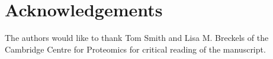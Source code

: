 \documentclass[12pt,english]{article}
\begin{document}

 
 
\section*{Acknowledgements}
The authors would like to thank Tom Smith and Lisa M. Breckels of the Cambridge Centre for Proteomics for critical reading of the manuscript. 



\end{document}

